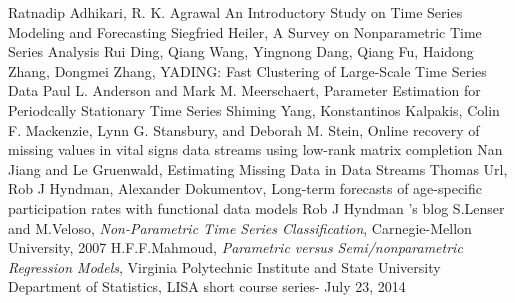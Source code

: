 \begin{thebibliography}{99}
 Ratnadip Adhikari, R. K. Agrawal An Introductory Study on Time Series Modeling and Forecasting
 Siegfried Heiler, A Survey on Nonparametric Time Series Analysis
 Rui Ding, Qiang Wang, Yingnong Dang, Qiang Fu, Haidong Zhang, Dongmei Zhang, YADING: Fast Clustering of Large-Scale Time Series Data
 Paul L. Anderson and Mark M. Meerschaert, Parameter Estimation for Periodcally Stationary Time Series
 Shiming Yang, Konstantinos Kalpakis, Colin F. Mackenzie, Lynn G. Stansbury, and Deborah M. Stein, Online recovery of missing values in vital signs data streams using low-rank matrix completion
 Nan Jiang and Le Gruenwald, Estimating Missing Data in Data Streams
 Thomas Url, Rob J Hyndman, Alexander Dokumentov, Long-term forecasts of age-specific participation rates with functional data models  
 
 Rob J Hyndman 's blog   
 S.Lenser and M.Veloso, \textit{Non-Parametric Time Series Classification}, Carnegie-Mellon University, 2007
 H.F.F.Mahmoud, \textit{Parametric versus Semi/nonparametric Regression Models}, Virginia Polytechnic Institute and State University Department of Statistics, LISA short course series- July 23, 2014
\end{thebibliography}





